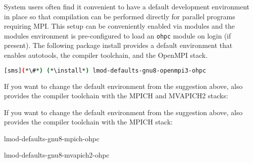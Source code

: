 System users often find it convenient to have a default development environment
in place so that compilation can be performed directly for parallel programs
requiring MPI. This setup can be conveniently enabled via modules and the \OHPC{}
modules environment is pre-configured to load an \texttt{ohpc} module on login
(if present). The following package install provides a default
environment that enables autotools, the \GNU{} compiler toolchain, and the
OpenMPI stack.

\begin{lstlisting}[language=bash]
[sms](*\#*) (*\install*) lmod-defaults-gnu8-openmpi3-ohpc
\end{lstlisting}

\begin{center}
\begin{tcolorbox}[]
\small
{}
If you want to change the default environment from the suggestion above, \OHPC{}
also provides the \GNU{} compiler toolchain with the MPICH and MVAPICH2 stacks:
\fi

If you want to change the default environment from the suggestion above, \OHPC{}
also provides the \GNU{} compiler toolchain with the MPICH stack:
\fi

\begin{itemize*}
\item lmod-defaults-gnu8-mpich-ohpc
\item lmod-defaults-gnu8-mvapich2-ohpc
\fi
\end{itemize*}
\end{tcolorbox}
\end{center}
